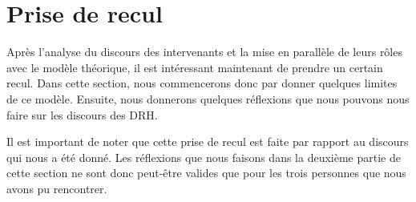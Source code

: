 \section{Prise de recul}

Après l'analyse du discours des intervenants et la mise en parallèle de leurs rôles avec le modèle théorique, il est intéressant maintenant de prendre un certain recul. Dans cette section, nous commencerons donc par donner quelques limites de ce modèle. Ensuite, nous donnerons quelques  réflexions que nous pouvons nous faire sur les discours des DRH.\newline

Il est important de noter que cette prise de recul est faite par rapport au discours qui nous a été donné. Les réflexions que nous faisons dans la deuxième partie de cette section ne sont donc peut-être valides que pour les trois personnes que nous avons pu rencontrer. \newline